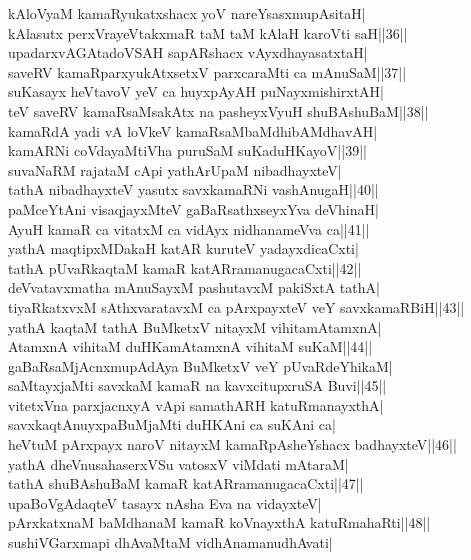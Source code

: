 \documentclass{article}
\begin{document}
kAloVyaM kamaRyukatxshacx yoV nareYsasxmupAsitaH|\\
kAlasutx perxVrayeVtakxmaR taM taM kAlaH karoVti saH||36||\\
upadarxvAGAtadoVSAH sapARshacx vAyxdhayasatxtaH|\\
saveRV kamaRparxyukAtxsetxV parxcaraMti ca mAnuSaM||37||\\
suKasayx heVtavoV yeV ca huyxpAyAH puNayxmishirxtAH|\\
teV saveRV kamaRsaMsakAtx na pasheyxVyuH shuBAshuBaM||38||\\
kamaRdA yadi vA loVkeV kamaRsaMbaMdhibAMdhavAH|\\
kamARNi coVdayaMtiVha puruSaM suKaduHKayoV||39||\\
suvaNaRM rajataM cApi yathArUpaM nibadhayxteV|\\
tathA nibadhayxteV yasutx savxkamaRNi vashAnugaH||40||\\
paMceYtAni visaqjayxMteV gaBaRsathxseyxYva deVhinaH|\\
AyuH kamaR ca vitatxM ca vidAyx nidhanameVva ca||41||\\
yathA maqtipxMDakaH katAR kuruteV yadayxdicaCxti|\\
tathA pUvaRkaqtaM kamaR katARramanugacaCxti||42||\\
deVvatavxmatha mAnuSayxM pashutavxM pakiSxtA tathA|\\
tiyaRkatxvxM sAthxvaratavxM ca pArxpayxteV veY savxkamaRBiH||43||\\
yathA kaqtaM tathA BuMketxV nitayxM vihitamAtamxnA|\\
AtamxnA vihitaM duHKamAtamxnA vihitaM suKaM||44||\\
gaBaRsaMjAcnxmupAdAya BuMketxV veY pUvaRdeYhikaM|\\
saMtayxjaMti savxkaM kamaR na kavxcitupxruSA Buvi||45||\\
vitetxVna parxjacnxyA vApi samathARH katuRmanayxthA|\\
savxkaqtAnuyxpaBuMjaMti duHKAni ca suKAni ca|\\
heVtuM pArxpayx naroV nitayxM kamaRpAsheYshacx badhayxteV||46||\\
yathA dheVnusahaserxVSu vatosxV viMdati mAtaraM|\\
tathA shuBAshuBaM kamaR katARramanugacaCxti||47||\\
upaBoVgAdaqteV tasayx nAsha Eva na vidayxteV|\\
pArxkatxnaM baMdhanaM kamaR koVnayxthA katuRmahaRti||48||\\
sushiVGarxmapi dhAvaMtaM vidhAnamanudhAvati|\\
\end{document}
